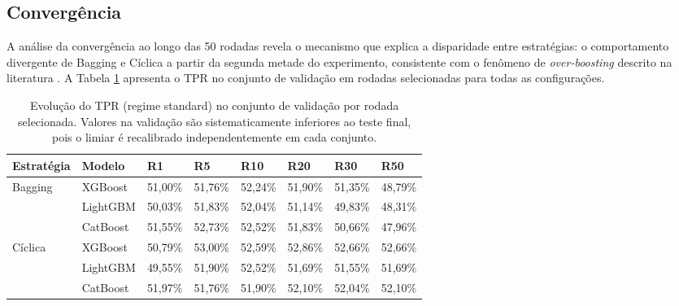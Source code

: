 \subsection{Convergência}

A análise da convergência ao longo das 50 rodadas revela o mecanismo que explica a disparidade entre estratégias: o comportamento divergente de Bagging e Cíclica a partir da segunda metade do experimento, consistente com o fenômeno de \textit{over-boosting} descrito na literatura \cite{chen2016xgboost, ke2017lightgbm}. A Tabela \ref{tab:convergencia} apresenta o TPR no conjunto de validação em rodadas selecionadas para todas as configurações.

\begin{table}[H]
\centering
\small
\begin{tabularx}{\textwidth}{|l|l|X|X|X|X|X|X|}
\hline
\bf Estratégia & \bf Modelo & \bf R1 & \bf R5 & \bf R10 & \bf R20 & \bf R30 & \bf R50 \\ \hline
\multirow{3}{*}{Bagging} & XGBoost & 51,00\% & 51,76\% & 52,24\% & 51,90\% & 51,35\% & 48,79\% \\ \cline{2-8}
 & LightGBM & 50,03\% & 51,83\% & 52,04\% & 51,14\% & 49,83\% & 48,31\% \\ \cline{2-8}
 & CatBoost & 51,55\% & 52,73\% & 52,52\% & 51,83\% & 50,66\% & 47,96\% \\ \hline
\multirow{3}{*}{Cíclica} & XGBoost & 50,79\% & 53,00\% & 52,59\% & 52,86\% & 52,66\% & 52,66\% \\ \cline{2-8}
 & LightGBM & 49,55\% & 51,90\% & 52,52\% & 51,69\% & 51,55\% & 51,69\% \\ \cline{2-8}
 & CatBoost & 51,97\% & 51,76\% & 51,90\% & 52,10\% & 52,04\% & 52,10\% \\ \hline
\end{tabularx}
\caption{Evolução do TPR (regime standard) no conjunto de validação por rodada selecionada. Valores na validação são sistematicamente inferiores ao teste final, pois o limiar é recalibrado independentemente em cada conjunto.}
\label{tab:convergencia}
\end{table}


